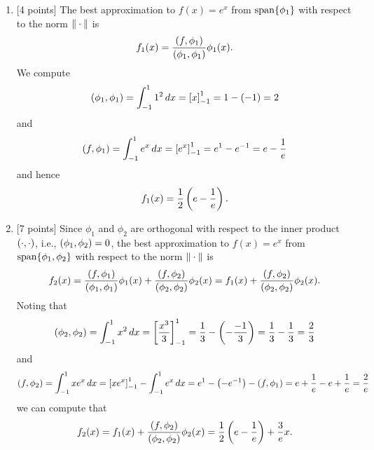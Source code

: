 \begin{solution}

\begin{enumerate}
\item {[4 points]} The best approximation to $f(x) = e^x$ from ${\rm span}\{\phi_1\}$ with respect to the norm $\|\cdot\|$ is
       \[ f_1(x) = {(f,\phi_1) \over (\phi_1, \phi_1)} \phi_1(x).\]
      We compute
\[
          (\phi_1,\phi_1) = \int_{-1}^1 1^2\,dx = \left[x\right]_{-1}^1=1-\left(-1\right)=2
\]
and
\[
          (f,\phi_1) = \int_{-1}^1 e^x\,dx = \left[e^x\right]_{-1}^1=e^1-e^{-1}=e-{1\over e}
\]
      and hence
       \[ f_1(x) = {1\over 2}\left(e-{1\over e}\right).\]
\item {[7 points]} Since $\phi_1$ and $\phi_2$ are
      orthogonal with respect to the inner product $(\cdot,\cdot)$, i.e., $(\phi_1, \phi_2) = 0$, the best approximation to $f(x) = e^x$ from ${\rm span}\{\phi_1,\phi_2\}$ with respect to the norm $\|\cdot\|$ is
       \[ f_2(x) = {(f,\phi_1) \over (\phi_1, \phi_1)} \phi_1(x) + {(f,\phi_2) \over (\phi_2, \phi_2)} \phi_2(x) = f_1(x) + {(f,\phi_2) \over (\phi_2, \phi_2)} \phi_2(x).\]
      Noting that
      \[
         (\phi_2,\phi_2) =\int_{-1}^1 x^2\,dx = \left[{x^3\over 3}\right]_{-1}^1 = {1 \over 3} - \left(-{-1 \over 3}\right) = {1 \over 3} - {1 \over 3} = {2\over 3}
\]
and
\[
         (f,\phi_2) =\int_{-1}^1 xe^x\,dx =\left[xe^x\right]_{-1}^1-\int_{-1}^1 e^x\,dx = e^1-\left(-e^{-1}\right)-(f,\phi_1) = e+{1\over e}-e+{1\over e} = {2\over e}
\]
      we can compute that
       \[ f_2(x) = f_1(x)
                  + {(f,\phi_2) \over (\phi_2, \phi_2)} \phi_2(x) = {1\over 2}\left(e-{1\over e}\right)
                  + {3\over e}x.\]
  


\end{enumerate}
\end{solution}
